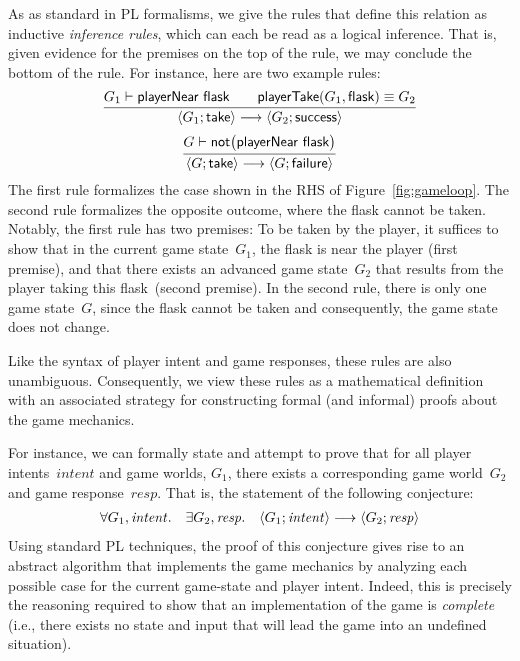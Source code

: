 As as standard in PL formalisms, we give the rules that define this
relation as inductive \emph{inference rules}, which can each be read
as a logical inference.  That is, given evidence for the premises on
the top of the rule, we may conclude the bottom of the rule.
%
For instance, here are two example rules:
\[
\infer{
  \GameStep{G_1}{\ctake}{G_2}{\textsf{success}}
}{ 
  G_1 \vdash \textsf{playerNear}~\textsf{flask}
  \quad
  \quad
  \textsf{playerTake}(G_1,\textsf{flask}) \equiv G_2
}
\]
\[
\infer{
  \GameStep{G}{\ctake}{G}{\textsf{failure}}
}{
  G \vdash \textsf{not}\big( \textsf{playerNear}~\textsf{flask} \big)
}
\]
The first rule formalizes the case shown in the RHS of
Figure~\ref{fig:gameloop}.
%
The second rule formalizes the opposite outcome, where the flask
cannot be taken.
%
Notably, the first rule has two premises: To be taken by the player,
it suffices to show that in the current game state~$G_1$, the flask is
near the player (first premise), and that there exists an advanced
game state~$G_2$ that results from the player taking this flask~(second premise).
%
In the second rule, there is only one game state~$G$, since the flask
cannot be taken and consequently, the game state does not change.

Like the syntax of player intent and game responses, these rules are
also unambiguous.
%
Consequently, we view these rules as a mathematical definition with an
associated strategy for constructing formal (and informal) proofs
about the game mechanics.

For instance, we can formally state and attempt to prove that for all
player intents~$\mathit{intent}$ and game worlds, $G_1$, there exists
a corresponding game world~$G_2$ and game response~$\mathit{resp}$.
%
That is, the statement of the following conjecture:
\[
\begin{array}{ccc}
\forall G_1, \mathit{intent}.
&
\exists G_2, \mathit{resp}.
&\left< G_1; \mathit{intent} \right> \longrightarrow \left< G_2; \mathit{resp} \right>
\end{array}
\]
Using standard PL techniques, the proof of this conjecture gives rise
to an abstract algorithm that implements the game mechanics by
analyzing each possible case for the current game-state and player
intent.
%
Indeed, this is precisely the reasoning required to show that an
implementation of the game is \emph{complete} (i.e., there exists no
state and input that will lead the game into an undefined situation).

